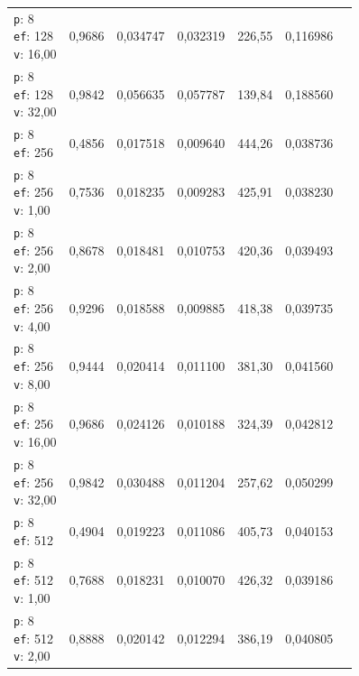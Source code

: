 \begin{table}[htbp]
\begin{tabularx}{\textwidth}{Xrrrrrr}
    \makecell{\texttt{p}: 8\\\texttt{ef}: 128\\\texttt{v}: 16,00} & 0,9686 & 0,034747 & 0,032319 & 226,55 & 0,116986 \\
    \makecell{\texttt{p}: 8\\\texttt{ef}: 128\\\texttt{v}: 32,00} & 0,9842 & 0,056635 & 0,057787 & 139,84 & 0,188560 \\
    \makecell{\texttt{p}: 8\\\texttt{ef}: 256} & 0,4856 & 0,017518 & 0,009640 & 444,26 & 0,038736 \\
    \makecell{\texttt{p}: 8\\\texttt{ef}: 256\\\texttt{v}: 1,00} & 0,7536 & 0,018235 & 0,009283 & 425,91 & 0,038230 \\
    \makecell{\texttt{p}: 8\\\texttt{ef}: 256\\\texttt{v}: 2,00} & 0,8678 & 0,018481 & 0,010753 & 420,36 & 0,039493 \\
    \makecell{\texttt{p}: 8\\\texttt{ef}: 256\\\texttt{v}: 4,00} & 0,9296 & 0,018588 & 0,009885 & 418,38 & 0,039735 \\
    \makecell{\texttt{p}: 8\\\texttt{ef}: 256\\\texttt{v}: 8,00} & 0,9444 & 0,020414 & 0,011100 & 381,30 & 0,041560 \\
    \makecell{\texttt{p}: 8\\\texttt{ef}: 256\\\texttt{v}: 16,00} & 0,9686 & 0,024126 & 0,010188 & 324,39 & 0,042812 \\
    \makecell{\texttt{p}: 8\\\texttt{ef}: 256\\\texttt{v}: 32,00} & 0,9842 & 0,030488 & 0,011204 & 257,62 & 0,050299 \\
    \makecell{\texttt{p}: 8\\\texttt{ef}: 512} & 0,4904 & 0,019223 & 0,011086 & 405,73 & 0,040153 \\
    \makecell{\texttt{p}: 8\\\texttt{ef}: 512\\\texttt{v}: 1,00} & 0,7688 & 0,018231 & 0,010070 & 426,32 & 0,039186 \\
    \makecell{\texttt{p}: 8\\\texttt{ef}: 512\\\texttt{v}: 2,00} & 0,8888 & 0,020142 & 0,012294 & 386,19 & 0,040805 \\

\end{tabularx}
\end{table}
